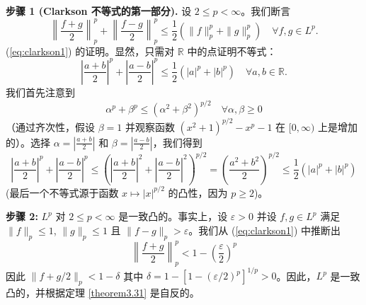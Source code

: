 \textbf{步骤 1 (Clarkson 不等式的第一部分).} 设 $2 \le p < \infty$。我们断言
\begin{equation}\label{eq:clarkson1}
\left\| \frac{f+g}{2} \right\|_p^p + \left\| \frac{f-g}{2} \right\|_p^p \le \frac{1}{2}(\|f\|_p^p + \|g\|_p^p) \quad \forall f, g \in L^p.
\end{equation}
(\ref{eq:clarkson1}) 的证明。显然，只需对 $\mathbb{R}$ 中的点证明不等式：
\[ \left| \frac{a+b}{2} \right|^p + \left| \frac{a-b}{2} \right|^p \le \frac{1}{2}(|a|^p + |b|^p) \quad \forall a, b \in \mathbb{R}. \]
我们首先注意到
\[ \alpha^p + \beta^p \le (\alpha^2 + \beta^2)^{p/2} \quad \forall \alpha, \beta \ge 0 \]
（通过齐次性，假设 $\beta=1$ 并观察函数 $(x^2+1)^{p/2} - x^p - 1$ 在 $[0, \infty)$ 上是增加的）。选择 $\alpha = |\frac{a+b}{2}|$ 和 $\beta=|\frac{a-b}{2}|$，我们得到
\[ \left| \frac{a+b}{2} \right|^p + \left| \frac{a-b}{2} \right|^p \le \left( \left| \frac{a+b}{2} \right|^2 + \left| \frac{a-b}{2} \right|^2 \right)^{p/2} = \left( \frac{a^2+b^2}{2} \right)^{p/2} \le \frac{1}{2}(|a|^p + |b|^p) \]
(最后一个不等式源于函数 $x \mapsto |x|^{p/2}$ 的凸性，因为 $p \ge 2$)。

\textbf{步骤 2:} $L^p$ 对 $2 \le p < \infty$ 是一致凸的。事实上，设 $\varepsilon > 0$ 并设 $f, g \in L^p$ 满足 $\|f\|_p \le 1$, $\|g\|_p \le 1$ 且 $\|f-g\|_p > \varepsilon$。我们从 (\ref{eq:clarkson1}) 中推断出
\[ \left\| \frac{f+g}{2} \right\|_p^p < 1 - \left(\frac{\varepsilon}{2}\right)^p \]
因此 $\|f+g/2\|_p < 1-\delta$ 其中 $\delta = 1 - [1 - (\varepsilon/2)^p]^{1/p} > 0$。因此，$L^p$ 是一致凸的，并根据定理 \ref{theorem3.31} 是自反的。

